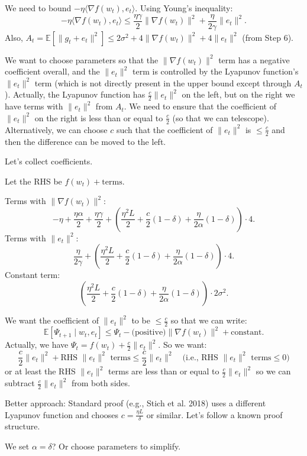 \documentclass{article}
\begin{document}
We need to bound $-\eta \langle \nabla f(w_t), e_t \rangle$. Using Young's inequality:
\[
-\eta \langle \nabla f(w_t), e_t \rangle \le \frac{\eta \gamma}{2} \|\nabla f(w_t)\|^2 + \frac{\eta}{2\gamma} \|e_t\|^2.
\]
Also, $A_t = \mathbb{E}[\|g_t + e_t\|^2] \le 2\sigma^2 + 4\|\nabla f(w_t)\|^2 + 4\|e_t\|^2$ (from Step 6).

We want to choose parameters so that the $\|\nabla f(w_t)\|^2$ term has a negative coefficient overall, and the $\|e_t\|^2$ term is controlled by the Lyapunov function's $\|e_t\|^2$ term (which is not directly present in the upper bound except through $A_t$). Actually, the Lyapunov function has $\frac{c}{2}\|e_t\|^2$ on the left, but on the right we have terms with $\|e_t\|^2$ from $A_t$. We need to ensure that the coefficient of $\|e_t\|^2$ on the right is less than or equal to $\frac{c}{2}$ (so that we can telescope). Alternatively, we can choose $c$ such that the coefficient of $\|e_t\|^2$ is $\le \frac{c}{2}$ and then the difference can be moved to the left.

Let's collect coefficients.

Let the RHS be $f(w_t) + \text{terms}$.

Terms with $\|\nabla f(w_t)\|^2$:
\[
-\eta + \frac{\eta \alpha}{2} + \frac{\eta \gamma}{2} + \left( \frac{\eta^2 L}{2} + \frac{c}{2}(1-\delta) + \frac{\eta}{2\alpha}(1-\delta) \right) \cdot 4.
\]
Terms with $\|e_t\|^2$:
\[
\frac{\eta}{2\gamma} + \left( \frac{\eta^2 L}{2} + \frac{c}{2}(1-\delta) + \frac{\eta}{2\alpha}(1-\delta) \right) \cdot 4.
\]
Constant term:
\[
\left( \frac{\eta^2 L}{2} + \frac{c}{2}(1-\delta) + \frac{\eta}{2\alpha}(1-\delta) \right) \cdot 2\sigma^2.
\]

We want the coefficient of $\|e_t\|^2$ to be $\le \frac{c}{2}$ so that we can write:
\[
\mathbb{E}[\Psi_{t+1} \mid w_t, e_t] \le \Psi_t - \text{(positive)} \|\nabla f(w_t)\|^2 + \text{constant}.
\]
Actually, we have $\Psi_t = f(w_t) + \frac{c}{2}\|e_t\|^2$. So we want:
\[
\frac{c}{2}\|e_t\|^2 + \text{RHS } \|e_t\|^2 \text{ terms} \le \frac{c}{2}\|e_t\|^2 \quad \text{(i.e., RHS } \|e_t\|^2 \text{ terms} \le 0)
\]
or at least the RHS $\|e_t\|^2$ terms are less than or equal to $\frac{c}{2}\|e_t\|^2$ so we can subtract $\frac{c}{2}\|e_t\|^2$ from both sides.

Better approach: Standard proof (e.g., Stich et al. 2018) uses a different Lyapunov function and chooses $c = \frac{\eta L}{\delta}$ or similar. Let's follow a known proof structure.

We set $\alpha = \delta$? Or choose parameters to simplify.
\end{document}
